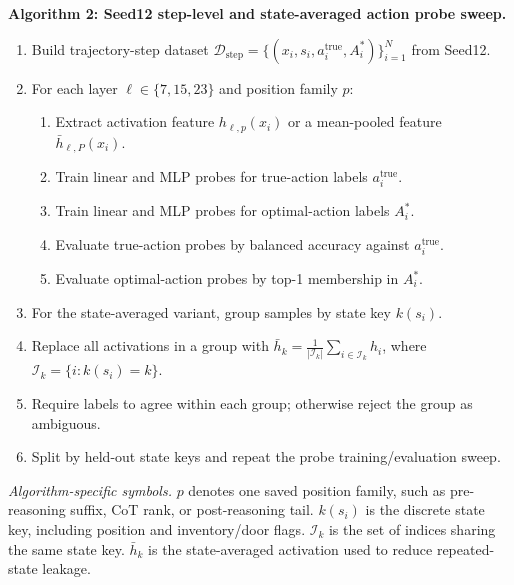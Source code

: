 \documentclass[11pt]{article}
\begin{document}
\medskip
\noindent\textbf{Algorithm 2: Seed12 step-level and state-averaged action probe sweep.}
\begin{enumerate}[leftmargin=*,itemsep=1pt,topsep=2pt]
  \item Build trajectory-step dataset $\mathcal{D}_{\mathrm{step}}=\{(x_i,s_i,a_i^{\mathrm{true}},A_i^*)\}_{i=1}^{N}$ from Seed12.
  \item For each layer $\ell\in\{7,15,23\}$ and position family $p$:
    \begin{enumerate}[leftmargin=1.5em,itemsep=1pt,topsep=1pt]
      \item Extract activation feature $h_{\ell,p}(x_i)$ or a mean-pooled feature $\bar{h}_{\ell,P}(x_i)$.
      \item Train linear and MLP probes for true-action labels $a_i^{\mathrm{true}}$.
      \item Train linear and MLP probes for optimal-action labels $A_i^*$.
      \item Evaluate true-action probes by balanced accuracy against $a_i^{\mathrm{true}}$.
      \item Evaluate optimal-action probes by top-1 membership in $A_i^*$.
    \end{enumerate}
  \item For the state-averaged variant, group samples by state key $k(s_i)$.
  \item Replace all activations in a group with $\bar{h}_{k}=\frac{1}{|\mathcal{I}_k|}\sum_{i\in\mathcal{I}_k}h_i$, where $\mathcal{I}_k=\{i:k(s_i)=k\}$.
  \item Require labels to agree within each group; otherwise reject the group as ambiguous.
  \item Split by held-out state keys and repeat the probe training/evaluation sweep.
\end{enumerate}
\noindent\emph{Algorithm-specific symbols.}
$p$ denotes one saved position family, such as pre-reasoning suffix, CoT rank, or post-reasoning tail.
$k(s_i)$ is the discrete state key, including position and inventory/door flags.
$\mathcal{I}_k$ is the set of indices sharing the same state key.
$\bar{h}_{k}$ is the state-averaged activation used to reduce repeated-state leakage.
\end{document}

